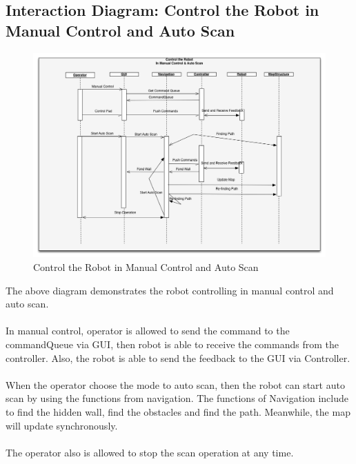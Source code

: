 \documentclass[11pt, a4paper]{report}
\begin{document}
\subsection{Interaction Diagram: Control the Robot in Manual Control and Auto Scan}
\begin{figure}[h]
  \centering
    \includegraphics[width=16cm]{Seq2.png}
  \caption{Control the Robot in Manual Control and Auto Scan}
\end{figure}
The above diagram demonstrates the robot controlling in manual control and auto scan.\\ \\
In manual control, operator is allowed to send the command to the commandQueue via GUI, then robot is able to receive the commands from the controller. Also, the robot is able to send the feedback to the GUI via Controller.\\ \\
When the operator choose the mode to auto scan, then the robot can start auto scan by using the functions from navigation. The functions of  Navigation include to find the hidden wall, find the obstacles and find the path. Meanwhile, the map will update synchronously.\\ \\
The operator also is allowed to stop the scan operation at any time.    
\pagebreak
\end{document}
